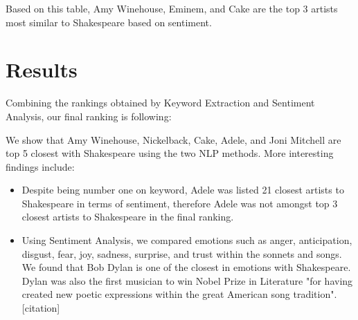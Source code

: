 \documentclass[10pt,a4paper]{article}
\begin{document}
Based on this table, Amy Winehouse, Eminem, and Cake are the top 3 artists most similar to Shakespeare based on sentiment.

\section{Results}

Combining the rankings obtained by Keyword Extraction and Sentiment Analysis, our final ranking is following:

\begin{table}[ht]
\centering
{}
\caption{Ranked Top 10 Most Similar Music Artist to Shakespeare} 
\label{tab:overallranktable}
\end{table}


We show that Amy Winehouse, Nickelback, Cake, Adele, and Joni Mitchell are top 5 closest with Shakespeare using the two NLP methods. More interesting findings include:

\begin{itemize}

\item Despite being number one on keyword, Adele was listed 21 closest artists to Shakespeare in terms of sentiment, therefore Adele was not amongst top 3 closest artists to Shakespeare in the final ranking.
\item Using Sentiment Analysis, we compared emotions such as anger, anticipation, disgust, fear, joy, sadness, surprise, and trust within the sonnets and songs. We found that Bob Dylan is one of the closest in emotions with Shakespeare. Dylan was also the first musician to win Nobel Prize in Literature "for having created new poetic expressions within the great American song tradition". [citation]

\end{itemize}
\end{document}

